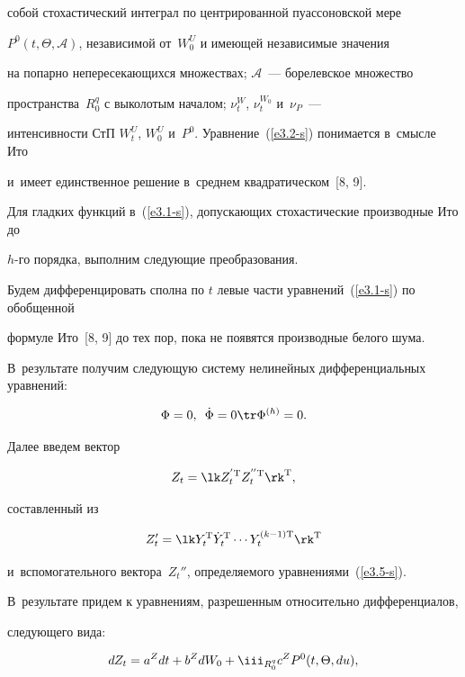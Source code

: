 собой стохастический интеграл по центрированной пуассоновской мере 

$P^0(t,\Theta, \mathcal{A})$, независимой от~$W_0^U$ и имеющей независимые значения 

на попарно непересекающихся множествах; $\mathcal{A}$~--- борелевское множество 

пространства~$R_0^q$ с выколотым началом; $\nu_t^W$, $\nu_t^{W_0}$ и~$\nu_P$~--- 

интенсивности СтП $W_t^U$, $W_{0}^U$ и~$P^0$. Уравнение~(\ref{e3.2-s}) понимается в~смысле Ито 

и~имеет единственное решение в~среднем квадратическом~[8, 9].





Для гладких функций в~(\ref{e3.1-s}), допускающих стохастические производные Ито до 

$h$-го порядка, выполним следующие преобразования.

Будем дифференцировать сполна по $t$ левые части уравнений~(\ref{e3.1-s}) по обобщенной 

формуле Ито~[8, 9] до тех пор, пока не появятся производные белого шума. 

В~результате получим следующую сис\-те\-му нелинейных дифференциальных уравнений:

 \begin{equation}

 \Phi=0,\enskip \dot \Phi =0\tr \Phi^{(h)}=0.\label{e3.5-s}

 \end{equation}

Далее введем вектор  

$$

Z_t = \lk Z_t^{'\mathrm{T}} Z_t^{''\mathrm{T}}\rk^{\mathrm{T}},

$$

 составленный из 

 $$

 Z_t' = \lk Y_t^{\mathrm{T}} \dot Y_t^{\mathrm{T}}\cdots Y_t^{(k-1)\mathrm{T}}\rk^{\mathrm{T}}

 $$ 

и~вспомогательного вектора~$Z_t''$, определяемого уравнениями~(\ref{e3.5-s}).

В~результате придем к уравнениям, разрешенным относительно дифференциалов, 

сле\-ду\-юще\-го вида:

\begin{equation}

dZ_t = a^Z  dt + b^Z d W_0 + \iii_{R_0^q} c^Z P^0(t,\Theta,du),\label{e3.6-s}

\end{equation}

